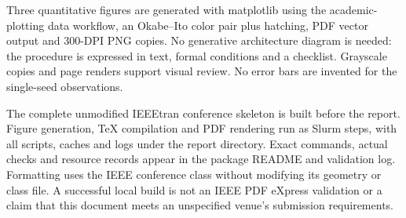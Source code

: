 \documentclass[conference]{IEEEtran}
\begin{document}
Three quantitative figures are generated with matplotlib using the academic-plotting data workflow, an Okabe--Ito color pair plus hatching, PDF vector output and 300-DPI PNG copies. No generative architecture diagram is needed: the procedure is expressed in text, formal conditions and a checklist. Grayscale copies and page renders support visual review. No error bars are invented for the single-seed observations.

The complete unmodified IEEEtran conference skeleton is built before the report. Figure generation, TeX compilation and PDF rendering run as Slurm steps, with all scripts, caches and logs under the report directory. Exact commands, actual checks and resource records appear in the package README and validation log. Formatting uses the IEEE conference class without modifying its geometry or class file. A successful local build is not an IEEE PDF eXpress validation or a claim that this document meets an unspecified venue's submission requirements.



\end{document}
